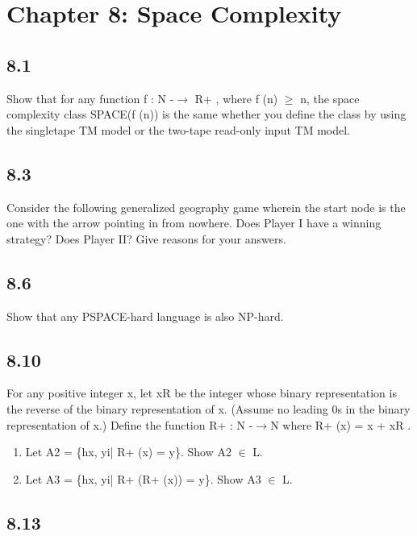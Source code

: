 \section*{Chapter 8: Space Complexity}

\subsection*{8.1}

Show that for any function f : N -$\to$ R+ , where f (n) $\ge$ n, the space complexity class SPACE(f (n)) is the same whether you define the class by using the singletape TM model or the two-tape read-only input TM model.


\subsection*{8.3}

Consider the following generalized geography game wherein the start node is the one with the arrow pointing in from nowhere. Does Player I have a winning strategy? Does Player II? Give reasons for your answers.


\subsection*{8.6}

Show that any PSPACE-hard language is also NP-hard.


\subsection*{8.10}

For any positive integer x, let xR be the integer whose binary representation is the reverse of the binary representation of x. (Assume no leading 0s in the binary representation of x.) Define the function R+ : N -$\to$N where R+ (x) = x + xR .

\begin{enumerate}[label=(\alph*), leftmargin=2.5em]

\item Let A2 = \{hx, yi| R+ (x) = y\}. Show A2 $\in$ L.

\item Let A3 = \{hx, yi| R+ (R+ (x)) = y\}. Show A3 $\in$ L.

\end{enumerate}


\subsection*{8.13}

